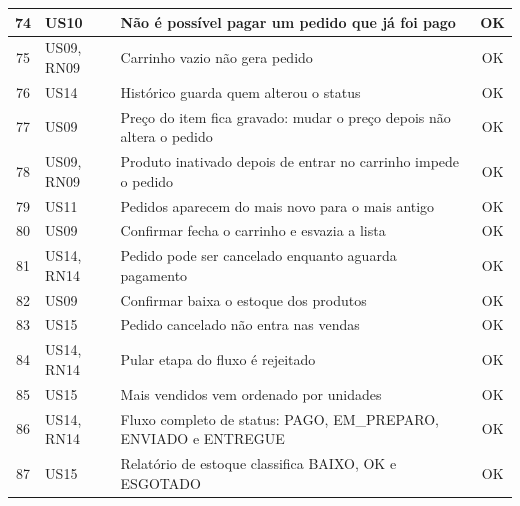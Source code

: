 \begin{longtable}{|c|p{2.5cm}|p{8.4cm}|c|}
74 & US10 & Não é possível pagar um pedido que já foi pago & \cellcolor{green!20}OK \\ \hline
75 & US09, RN09 & Carrinho vazio não gera pedido & \cellcolor{green!20}OK \\ \hline
76 & US14 & Histórico guarda quem alterou o status & \cellcolor{green!20}OK \\ \hline
77 & US09 & Preço do item fica gravado: mudar o preço depois não altera o pedido & \cellcolor{green!20}OK \\ \hline
78 & US09, RN09 & Produto inativado depois de entrar no carrinho impede o pedido & \cellcolor{green!20}OK \\ \hline
79 & US11 & Pedidos aparecem do mais novo para o mais antigo & \cellcolor{green!20}OK \\ \hline
80 & US09 & Confirmar fecha o carrinho e esvazia a lista & \cellcolor{green!20}OK \\ \hline
81 & US14, RN14 & Pedido pode ser cancelado enquanto aguarda pagamento & \cellcolor{green!20}OK \\ \hline
82 & US09 & Confirmar baixa o estoque dos produtos & \cellcolor{green!20}OK \\ \hline
83 & US15 & Pedido cancelado não entra nas vendas & \cellcolor{green!20}OK \\ \hline
84 & US14, RN14 & Pular etapa do fluxo é rejeitado & \cellcolor{green!20}OK \\ \hline
85 & US15 & Mais vendidos vem ordenado por unidades & \cellcolor{green!20}OK \\ \hline
86 & US14, RN14 & Fluxo completo de status: PAGO, EM\_PREPARO, ENVIADO e ENTREGUE & \cellcolor{green!20}OK \\ \hline
87 & US15 & Relatório de estoque classifica BAIXO, OK e ESGOTADO & \cellcolor{green!20}OK \\ \hline
\end{longtable}\normalsize

